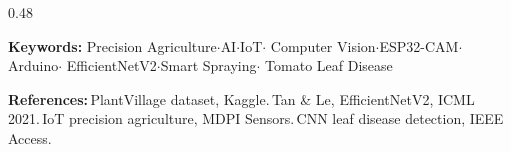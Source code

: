 \documentclass[final,t]{beamer}
\begin{document}
\begin{frame}[t]{}
\begin{columns}[T]
\begin{column}{0.48\textwidth}
\vspace{0.4cm}

\begin{posterbox}[title=Keywords \& References]
{\normalsize
\textbf{Keywords:}\enspace
Precision Agriculture\;$\cdot$\;AI\;$\cdot$\;IoT\;$\cdot$\;%
Computer Vision\;$\cdot$\;ESP32-CAM\;$\cdot$\;Arduino\;$\cdot$\;%
EfficientNetV2\;$\cdot$\;Smart Spraying\;$\cdot$\;%
Tomato Leaf Disease\par}

\vspace{0.3em}
{\small
\textbf{References:}\enspace
[1]\,PlantVillage dataset, Kaggle.\enspace
[2]\,Tan \& Le, EfficientNetV2, ICML 2021.\enspace
[3]\,IoT precision agriculture, MDPI Sensors.\enspace
[4]\,CNN leaf disease detection, IEEE Access.\par}
\end{posterbox}

\end{column}
\end{columns}

\end{frame}
\end{document}
